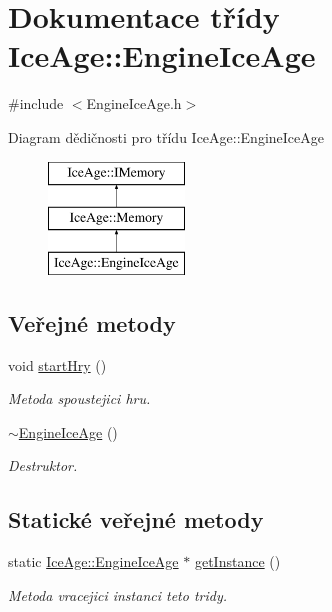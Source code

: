 \hypertarget{classIceAge_1_1EngineIceAge}{}\section{Dokumentace třídy Ice\+Age\+:\+:Engine\+Ice\+Age}
\label{classIceAge_1_1EngineIceAge}


{\ttfamily \#include $<$Engine\+Ice\+Age.\+h$>$}

Diagram dědičnosti pro třídu Ice\+Age\+:\+:Engine\+Ice\+Age\begin{figure}[H]
\begin{center}
\leavevmode
\includegraphics[height=3.000000cm]{d5/d14/classIceAge_1_1EngineIceAge}
\end{center}
\end{figure}
\subsection*{Veřejné metody}
\begin{DoxyCompactItemize}
\item 
void \hyperlink{classIceAge_1_1EngineIceAge_a69b6bf513ebcd1f83317753a09c159e4}{start\+Hry} ()
\begin{DoxyCompactList}\small\item\em Metoda spoustejici hru. \end{DoxyCompactList}\item 
\hyperlink{classIceAge_1_1EngineIceAge_ac1f9527247e875dc5e2283dd463358d6}{$\sim$\+Engine\+Ice\+Age} ()
\begin{DoxyCompactList}\small\item\em Destruktor. \end{DoxyCompactList}\end{DoxyCompactItemize}
\subsection*{Statické veřejné metody}
\begin{DoxyCompactItemize}
\item 
static \hyperlink{classIceAge_1_1EngineIceAge}{Ice\+Age\+::\+Engine\+Ice\+Age} $\ast$ \hyperlink{classIceAge_1_1EngineIceAge_aa542969934711aa691e0df3da701e830}{get\+Instance} ()
\begin{DoxyCompactList}\small\item\em Metoda vracejici instanci teto tridy. \end{DoxyCompactList}\end{DoxyCompactItemize}
